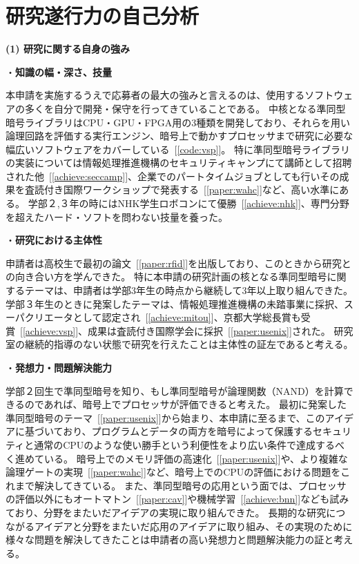 
\section{研究遂行力の自己分析}

\noindent\textbf{(1) 研究に関する自身の強み}

\noindent・\textbf{知識の幅・深さ、技量}

本申請を実施するうえで応募者の最大の強みと言えるのは、使用するソフトウェアの多くを自分で開発・保守を行ってきていることである。
中核となる準同型暗号ライブラリはCPU・GPU・FPGA用の3種類を開発しており、それらを用い論理回路を評価する実行エンジン、暗号上で動かすプロセッサまで研究に必要な幅広いソフトウェアをカバーしている~[\ref{code:vsp}]。
特に準同型暗号ライブラリの実装については情報処理推進機構のセキュリティキャンプにて講師として招聘された他~[\ref{achieve:seccamp}]、企業でのパートタイムジョブとしても行いその成果を査読付き国際ワークショップで発表する~[\ref{paper:wahc}]など、高い水準にある。
学部２,３年の時にはNHK学生ロボコンにて優勝~[\ref{achieve:nhk}]、専門分野を超えたハード・ソフトを問わない技量を養った。

\noindent・\textbf{研究における主体性}

申請者は高校生で最初の論文~[\ref{paper:rfid}]を出版しており、このときから研究との向き合い方を学んできた。
特に本申請の研究計画の核となる準同型暗号に関するテーマは、申請者は学部3年生の時点から継続して3年以上取り組んできた。
学部３年生のときに発案したテーマは、情報処理推進機構の未踏事業に採択、スーパクリエータとして認定され~[\ref{achieve:mitou}]、京都大学総長賞も受賞~[\ref{achieve:vsp}]、成果は査読付き国際学会に採択~[\ref{paper:usenix}]された。
研究室の継続的指導のない状態で研究を行えたことは主体性の証左であると考える。

\noindent・\textbf{発想力・問題解決能力}

学部２回生で準同型暗号を知り、もし準同型暗号が論理関数（NAND）を計算できるのであれば、暗号上でプロセッサが評価できると考えた。
最初に発案した準同型暗号のテーマ~[\ref{paper:usenix}]から始まり、本申請に至るまで、このアイデアに基づいており、プログラムとデータの両方を暗号によって保護するセキュリティと通常のCPUのような使い勝手という利便性をより広い条件で達成するべく進めている。
暗号上でのメモリ評価の高速化~[\ref{paper:usenix}]や、より複雑な論理ゲートの実現~[\ref{paper:wahc}]など、暗号上でのCPUの評価における問題をこれまで解決してきている。
また、準同型暗号の応用という面では、プロセッサの評価以外にもオートマトン~[\ref{paper:cav}]や機械学習~[\ref{achieve:bnn}]なども試みており、分野をまたいだアイデアの実現に取り組んできた。
長期的な研究につながるアイデアと分野をまたいだ応用のアイデアに取り組み、その実現のために様々な問題を解決してきたことは申請者の高い発想力と問題解決能力の証と考える。

